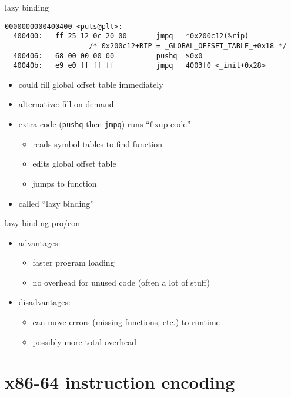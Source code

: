 \begin{frame}[fragile,label=dynamicPutsLazy]{lazy binding}
\begin{Verbatim}[commandchars=Q\{\},fontsize=\fontsize{8}{9}\selectfont]
0000000000400400 <puts@plt>:
  400400:	ff 25 12 0c 20 00    	jmpq   *0x200c12(%rip) 
                    /* 0x200c12+RIP = _GLOBAL_OFFSET_TABLE_+0x18 */
  400406:	68 00 00 00 00       	pushq  $0x0
  40040b:	e9 e0 ff ff ff       	jmpq   4003f0 <_init+0x28>
\end{Verbatim}
\begin{itemize}
    \item could fill global offset table immediately
    \item alternative: fill on demand
    \item extra code ({\tt pushq} then {\tt jmpq}) runs ``fixup code''
        \begin{itemize}
        \item reads symbol tables to find function
        \item edits global offset table
        \item jumps to function
        \end{itemize}
    \item called ``lazy binding''
\end{itemize}
\end{frame}

\begin{frame}{lazy binding pro/con}
\begin{itemize}
    \item advantages:
    \begin{itemize}
        \item faster program loading
        \item no overhead for unused code (often a lot of stuff)
    \end{itemize}
    \item disadvantages:
    \begin{itemize}
        \item can move errors (missing functions, etc.) to runtime
        \item possibly more total overhead
    \end{itemize}
\end{itemize}
\end{frame}




\section{x86-64 instruction encoding}

